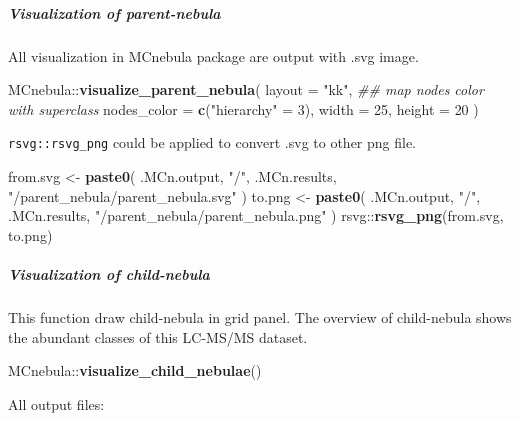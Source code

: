 \documentclass[]{tufte-handout}
\newenvironment{Shaded}{}{}
\newcommand{\CommentTok}[1]{\textcolor[rgb]{0.38,0.63,0.69}{\textit{#1}}}
\newcommand{\DataTypeTok}[1]{\textcolor[rgb]{0.56,0.13,0.00}{#1}}
\newcommand{\DecValTok}[1]{\textcolor[rgb]{0.25,0.63,0.44}{#1}}
\newcommand{\KeywordTok}[1]{\textcolor[rgb]{0.00,0.44,0.13}{\textbf{#1}}}
\newcommand{\NormalTok}[1]{#1}
\newcommand{\OperatorTok}[1]{\textcolor[rgb]{0.40,0.40,0.40}{#1}}
\newcommand{\StringTok}[1]{\textcolor[rgb]{0.25,0.44,0.63}{#1}}
\begin{document}
\hypertarget{visualization-of-parent-nebula}{%
\subparagraph{Visualization of
parent-nebula}\label{visualization-of-parent-nebula}}

All visualization in MCnebula package are output with .svg image.

\begin{Shaded}
\begin{Highlighting}[]
\NormalTok{MCnebula}\OperatorTok{::}\KeywordTok{visualize\_parent\_nebula}\NormalTok{(}
  \DataTypeTok{layout =} \StringTok{"kk"}\NormalTok{,}
  \CommentTok{\#\# map nodes color with superclass}
  \DataTypeTok{nodes\_color =} \KeywordTok{c}\NormalTok{(}\StringTok{"hierarchy"}\NormalTok{ =}\StringTok{ }\DecValTok{3}\NormalTok{),}
  \DataTypeTok{width =} \DecValTok{25}\NormalTok{,}
  \DataTypeTok{height =} \DecValTok{20}
\NormalTok{)}
\end{Highlighting}
\end{Shaded}

\texttt{rsvg::rsvg\_png} could be applied to convert .svg to other png
file.

\begin{Shaded}
\begin{Highlighting}[]
\NormalTok{from.svg \textless{}{-}}\StringTok{ }\KeywordTok{paste0}\NormalTok{(}
\NormalTok{  .MCn.output, }\StringTok{"/"}\NormalTok{, .MCn.results,}
  \StringTok{"/parent\_nebula/parent\_nebula.svg"}
\NormalTok{)}
\NormalTok{to.png \textless{}{-}}\StringTok{ }\KeywordTok{paste0}\NormalTok{(}
\NormalTok{  .MCn.output, }\StringTok{"/"}\NormalTok{, .MCn.results,}
  \StringTok{"/parent\_nebula/parent\_nebula.png"}
\NormalTok{)}
\NormalTok{rsvg}\OperatorTok{::}\KeywordTok{rsvg\_png}\NormalTok{(from.svg, to.png)}
\end{Highlighting}
\end{Shaded}

\hypertarget{visualization-of-child-nebula}{%
\subparagraph{Visualization of
child-nebula}\label{visualization-of-child-nebula}}

This function draw child-nebula in grid panel. The overview of
child-nebula shows the abundant classes of this LC-MS/MS dataset.

\begin{Shaded}
\begin{Highlighting}[]
\NormalTok{MCnebula}\OperatorTok{::}\KeywordTok{visualize\_child\_nebulae}\NormalTok{()}
\end{Highlighting}
\end{Shaded}

All output files:
\end{document}
